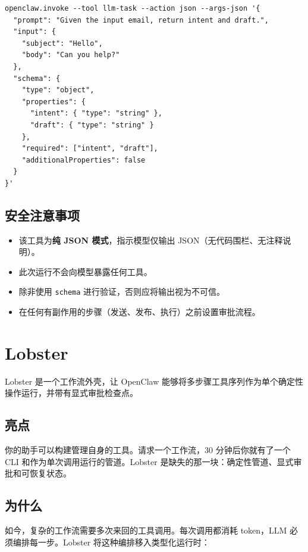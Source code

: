 \begin{lstlisting}
openclaw.invoke --tool llm-task --action json --args-json '{
  "prompt": "Given the input email, return intent and draft.",
  "input": {
    "subject": "Hello",
    "body": "Can you help?"
  },
  "schema": {
    "type": "object",
    "properties": {
      "intent": { "type": "string" },
      "draft": { "type": "string" }
    },
    "required": ["intent", "draft"],
    "additionalProperties": false
  }
}'
\end{lstlisting}


\subsection{安全注意事项}


\begin{itemize}
  \item 该工具为\textbf{纯 JSON 模式}，指示模型仅输出 JSON（无代码围栏、无注释说明）。
  \item 此次运行不会向模型暴露任何工具。
  \item 除非使用 \texttt{schema} 进行验证，否则应将输出视为不可信。
  \item 在任何有副作用的步骤（发送、发布、执行）之前设置审批流程。
\end{itemize}



\clearpage

\section{Lobster}


Lobster 是一个工作流外壳，让 OpenClaw 能够将多步骤工具序列作为单个确定性操作运行，并带有显式审批检查点。

\subsection{亮点}


你的助手可以构建管理自身的工具。请求一个工作流，30 分钟后你就有了一个 CLI 和作为单次调用运行的管道。Lobster 是缺失的那一块：确定性管道、显式审批和可恢复状态。

\subsection{为什么}


如今，复杂的工作流需要多次来回的工具调用。每次调用都消耗 token，LLM 必须编排每一步。Lobster 将这种编排移入类型化运行时：

